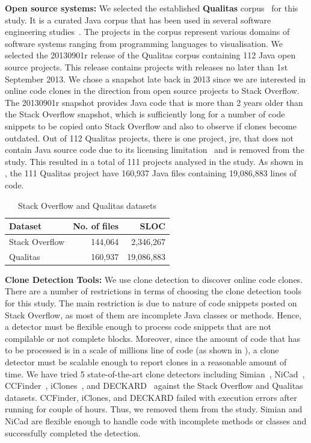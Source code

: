 \documentclass[sigconf,review, anonymous]{acmart}
\begin{document}
\textbf{Open source systems: }
We selected the established \textbf{Qualitas} corpus~\cite{QualitasCorpus} 
for this study. It is a curated Java corpus that has been used in several
software engineering
studies~\cite{Taube-Schock2011,Beckman2011,Vasilescu2011,Omar2012}. The
projects in the corpus represent various domains of software systems
ranging from programming languages to
visualisation. We selected the 20130901r release
of the Qualitas corpus containing 112 Java open source projects. This
release contains projects with releases no later than 1st September
2013. We chose a snapshot late back in 2013 since we are interested in
online code clones in the direction from open source projects to Stack
Overflow. The 20130901r snapshot provides Java code that is more than
2 years older than the Stack Overflow snapshot, which is sufficiently
long for a number of code snippets to be copied onto Stack Overflow
and also to observe if clones become outdated. Out of 112 Qualitas
projects, there is one project, \textsf{jre}, that does not contain
Java source code due to its licensing limitation~\cite{QualitasCorpus}
and is removed from the study. This resulted in a total of 111
projects analysed in the study. As shown in , the
111 Qualitas project have 160,937 Java files containing 19,086,883
lines of
code. %

\begin{table}
  \centering
  \caption{Stack Overflow and Qualitas datasets}
  \label{tab:datasets}
  \begin{tabular}{lrr}
    \hline 
    Dataset & No. of files & SLOC \\
    \hline
    Stack Overflow & 144,064 & 2,346,267 \\ 
    Qualitas &  160,937 & 19,086,883 \\ 
    \hline 
  \end{tabular} 
\end{table}

\textbf{Clone Detection Tools: }
We use clone detection to discover online code clones. 
There are a number of restrictions in terms of choosing the clone
detection tools for this study. The main restriction is due to nature
of code snippets posted on Stack Overflow, as most of them are
incomplete Java classes or methods. Hence, a detector must be flexible
enough to process code snippets that are not compilable or not
complete blocks. Moreover, since the amount of code that has to be
processed is in a scale of millions line of code (as shown in
), a clone detector must be scalable enough to
report clones in a reasonable amount of time. We have tried 5
state-of-the-art clone detectors including Simian~\cite{simian},
NiCad~\cite{Cordy,Roy2008}, CCFinder~\cite{Kamiya2002},
iClones~\cite{Gode2009}, and DECKARD~\cite{Jiang2007a} against the
Stack Overflow and Qualitas datasets. CCFinder, iClones, and DECKARD
failed with execution errors after running for couple of hours. Thus,
we removed them from the study. Simian and NiCad are flexible enough
to handle code with incomplete methods or classes and successfully
completed the detection.
\end{document}
